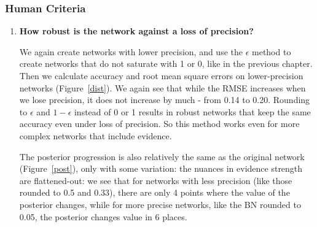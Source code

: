 \subsubsection{Human Criteria}
\begin{enumerate}
	\item \textbf{How robust is the network against a loss of precision?}

	We again create networks with lower precision, and use the $\epsilon$ method to create networks that do not saturate with 1 or 0, like in the previous chapter. Then we calculate accuracy and root mean square errors on lower-precision networks (Figure~\ref{dist}). We again see that while the RMSE increases when we lose precision, it does not increase by much - from 0.14 to 0.20. Rounding to $\epsilon$ and $1-\epsilon$ instead of 0 or 1 results in robust networks that keep the same accuracy even under loss of precision. So this method works even for more complex networks that include evidence. 
	
	The posterior progression is also relatively the same as the original network (Figure~\ref{post}), only with some variation: the nuances in evidence strength are flattened-out: we see that for networks with less precision (like those rounded to 0.5 and 0.33), there are only 4 points where the value of the posterior changes, while for more precise networks, like the BN rounded to 0.05, the posterior changes value in 6 places. 
	

\end{enumerate}
